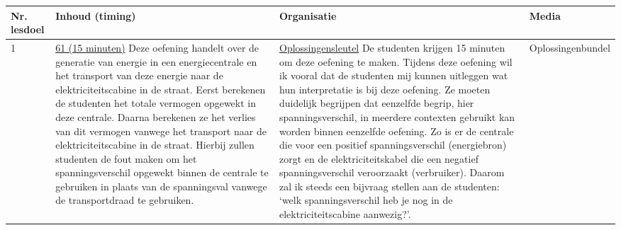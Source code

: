 \begin{landscape}
		\begin{tabularx}{1.56\textwidth}{|p{1.5cm}|p{6cm}|X|p{4cm}|}
		\hline
		\textbf{Nr. lesdoel } & \textbf{Inhoud (timing)}  & \textbf{Organisatie } & \textbf{Media } \\ \hline
		1\newline 3\newline 4\newline 5 \newline 8&\underline{61 (15 minuten)}\newline
		Deze oefening handelt over de generatie van energie in een energiecentrale en het transport van deze energie naar de elektriciteitscabine in de straat. Eerst berekenen de studenten het totale vermogen opgewekt in deze centrale. Daarna berekenen ze het verlies van dit vermogen vanwege  het transport naar de elektriciteitscabine in de straat. Hierbij zullen studenten de fout maken om het spanningsverschil opgewekt binnen de centrale te gebruiken in plaats van de spanningsval vanwege de transportdraad te gebruiken. 
		
		& \underline{Oplossingensleutel}
		   De studenten krijgen 15 minuten om deze oefening te maken.  Tijdens deze oefening wil ik vooral dat de studenten mij kunnen uitleggen wat hun interpretatie is bij deze oefening. Ze moeten duidelijk begrijpen dat eenzelfde begrip, hier spanningsverschil, in meerdere contexten gebruikt kan worden binnen eenzelfde oefening. Zo is er de centrale die voor een positief spanningsverschil (energiebron) zorgt en de elektriciteitskabel die een negatief spanningsverschil veroorzaakt (verbruiker). Daarom zal ik steeds een bijvraag stellen aan de studenten: `welk spanningsverschil heb je nog in de elektriciteitscabine aanwezig?'.
		& Oplossingenbundel
		\\ \hline
	\end{tabularx}
	

\end{landscape}
